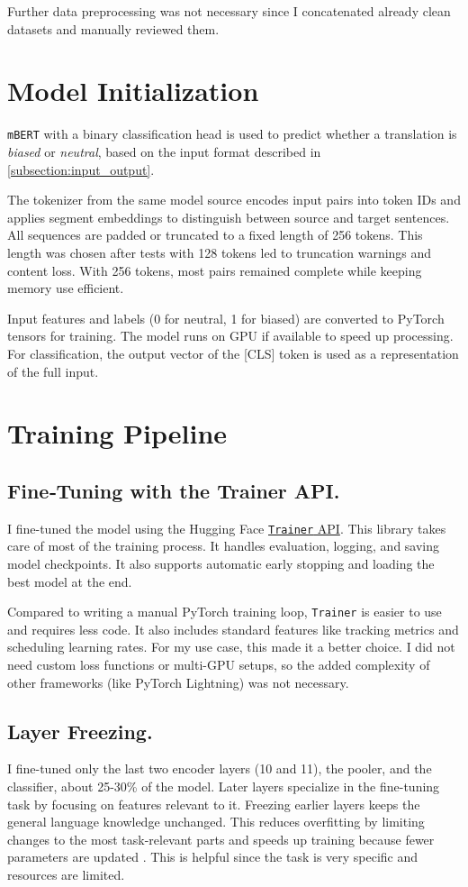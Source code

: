 Further data preprocessing was not necessary since I concatenated already clean datasets and manually reviewed them.

\section{Model Initialization}
    \texttt{mBERT} with a binary classification head is used to predict whether a translation is \textit{biased} or \textit{neutral}, based on the input format described in \autoref{subsection:input_output}.

    The tokenizer from the same model source encodes input pairs into token IDs and applies segment embeddings to distinguish between source and target sentences. All sequences are padded or truncated to a fixed length of 256 tokens. This length was chosen after tests with 128 tokens led to truncation warnings and content loss. With 256 tokens, most pairs remained complete while keeping memory use efficient.

    Input features and labels (0 for neutral, 1 for biased) are converted to PyTorch tensors for training. The model runs on GPU if available to speed up processing. For classification, the output vector of the [CLS] token is used as a representation of the full input.

\section{Training Pipeline}
\subsection{{Fine‑Tuning with the Trainer API.}}
    I fine-tuned the model using the Hugging Face \href{https://huggingface.co/docs/transformers/en/main_classes/trainer}{\texttt{Trainer} API}. This library takes care of most of the training process. It handles evaluation, logging, and saving model checkpoints. It also supports automatic early stopping and loading the best model at the end.

    Compared to writing a manual PyTorch training loop, \texttt{Trainer} is easier to use and requires less code. It also includes standard features like tracking metrics and scheduling learning rates. For my use case, this made it a better choice. I did not need custom loss functions or multi-GPU setups, so the added complexity of other frameworks (like PyTorch Lightning) was not necessary.

    \subsection{Layer Freezing.}
    I fine-tuned only the last two encoder layers (10 and 11), the pooler, and the classifier, about 25-30\% of the model. Later layers specialize in the fine-tuning task by focusing on features relevant to it. Freezing earlier layers keeps the general language knowledge unchanged. This reduces overfitting by limiting changes to the most task-relevant parts and speeds up training because fewer parameters are updated \citep{nadipalliLayerWiseEvolutionRepresentations2025}. This is helpful since the task is very specific and resources are limited.


